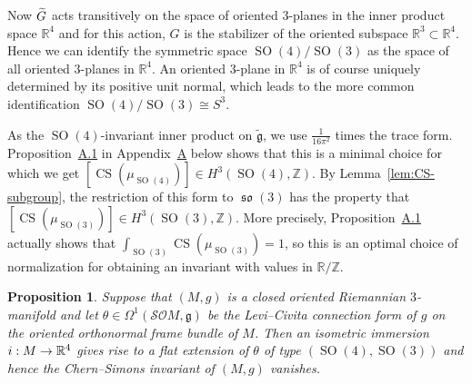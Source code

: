 \documentclass[10pt,a4paper]{amsart}
\newcommand{\Om}{\Omega}
\DeclareMathOperator{\CS}{CS}
\DeclareMathOperator{\SO}{SO}
\DeclareMathOperator{\fkso}{\mathfrak{so}}
\newcommand*{\R}{\mathbb{R}}
\newcommand{\Z}{\mathbb{Z}}
\newcommand{\tfg}{\widetilde{\mathfrak g}}
\newcommand{\fkg}{\mathfrak{g}}
\newcommand{\clSO}{\mathcal{SO}}
\renewcommand*{\to}{\mathchoice{\longrightarrow}{\rightarrow}{\rightarrow}{\rightarrow}}
\let\oldtilde\tilde
\renewcommand*{\tilde}[1]{\mathchoice{\widetilde{#1}}{\widetilde{#1}}{\oldtilde{#1}}{\oldtilde{#1}}}
\newtheorem{prop}[theo]{Proposition}
\theoremstyle{definition}\newtheorem{defi}[theo]{Definition}
\begin{document}
Now $\tilde G$ acts transitively on the space of oriented $3$-planes in the inner product space $\R^4$ and for this action, $G$ is the stabilizer of the oriented subspace $\R^3\subset\R^4$. Hence we can identify the symmetric space $\SO(4)/\SO(3)$ as the space of all oriented $3$-planes in $\R^4$. An oriented $3$-plane in $\R^4$ is of course uniquely determined by its positive unit normal, which leads to the more common identification $\SO(4)/\SO(3)\cong S^3$.

As the $\SO(4)$-invariant inner product on $\tfg$, we use $\frac{1}{16\pi^2}$ times the trace form. Proposition~\href{https://ahl.centre-mersenne.org/item/AHL_2025__8__1037_0/}{A.1} in Appendix~\href{https://ahl.centre-mersenne.org/item/AHL_2025__8__1037_0/}{A} below shows that this is a minimal choice for which we get $[\CS(\mu_{\SO(4)})]\in H^3(\SO(4),\Z)$. By Lemma~\ref{lem:CS-subgroup}, the restriction of this form to $\fkso(3)$ has the property that $[\CS(\mu_{\SO(3)})]\in H^3(\SO(3),\Z)$. More precisely, Proposition~\href{https://ahl.centre-mersenne.org/item/AHL_2025__8__1037_0/}{A.1} actually shows that $\int_{\SO(3)}\CS(\mu_{\SO(3)})=1$, so this is an optimal choice of normalization for obtaining an invariant with values in $\R/\Z$.

\begin{prop}\label{prop:Riemannflatext}
Suppose that $(M,g)$ is a closed oriented Riemannian $3$-manifold and let $\theta\in\Om^1(\clSO M,\fkg)$ be the Levi--Civita connection form of $g$ on the oriented orthonormal frame bundle of $M$. Then an isometric immersion $i: M\to
\R^4$ gives rise to a flat extension of $\theta$ of type $(\SO(4),\SO(3))$ and hence the Chern--Simons invariant of $(M,g)$ vanishes.
\end{prop}
\end{document}
